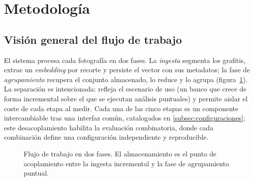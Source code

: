 \section{Metodología}
\label{sec:metodologia}

\subsection{Visión general del flujo de trabajo}
\label{subsec:vision}
El sistema procesa cada fotografía en dos fases. La \emph{ingesta} segmenta los
grafitis, extrae un \textit{embedding} por recorte y persiste el vector con sus
metadatos; la fase de \emph{agrupamiento} recupera el conjunto almacenado, lo
reduce y lo agrupa (figura~\ref{fig:pipeline}). La separación es intencionada:
refleja el escenario de uso (un banco que crece de forma incremental sobre el
que se ejecutan análisis puntuales) y permite aislar el coste de cada etapa al
medir. Cada una de las cinco etapas es un componente intercambiable tras una
interfaz común, catalogados en \ref{subsec:configuraciones}; este desacoplamiento
habilita la evaluación combinatoria, donde cada combinación define una
configuración independiente y reproducible.

\begin{figure}[h!]
  \centering
  \shorthandoff{<>}%
  \shorthandon{<>}%
  \caption[Flujo de trabajo en dos fases]{Flujo de trabajo en dos fases. El almacenamiento es el punto de
  acoplamiento entre la ingesta incremental y la fase de agrupamiento puntual.}
  \label{fig:pipeline}
\end{figure}


